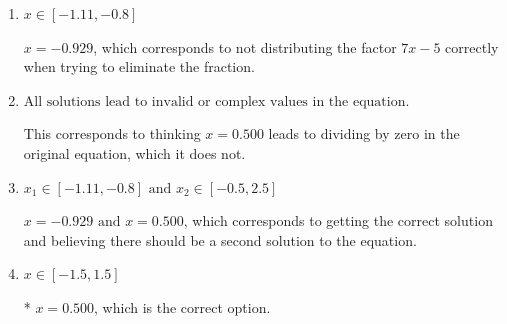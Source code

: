 \documentclass{extbook}[14pt]
\begin{document}
\begin{enumerate}
{\begin{enumerate}[label=\Alph*.]
$x = 0.381 \text{ and } x = 0.500$, which corresponds to getting the correct solution and believing there should be a second solution to the equation.
\item \( x \in [-1.11,-0.8] \)

$x = -0.929$, which corresponds to not distributing the factor $7x -5$ correctly when trying to eliminate the fraction.
\item \( \text{All solutions lead to invalid or complex values in the equation.} \)

This corresponds to thinking $x = 0.500$ leads to dividing by zero in the original equation, which it does not.
\item \( x_1 \in [-1.11, -0.8] \text{ and } x_2 \in [-0.5,2.5] \)

$x = -0.929 \text{ and } x = 0.500$, which corresponds to getting the correct solution and believing there should be a second solution to the equation.
\item \( x \in [-1.5,1.5] \)

* $x = 0.500$, which is the correct option.
\end{enumerate}

}
\end{enumerate}
\end{document}
